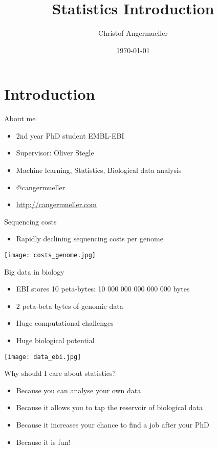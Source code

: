 \documentclass{beamer}
\author{Christof Angermueller}
\title{Statistics Introduction}
\date{\today}
\begin{document}
 

\section{Introduction}

\begin{frame}{About me}
  \begin{itemize}
    \item 2nd year PhD student EMBL-EBI
    \item Supervisor: Oliver Stegle
    \item Machine learning, Statistics, Biological data analysis
    \item @cangermueller
    \item \url{http://cangermueller.com}
  \end{itemize}
\end{frame}

\begin{frame}{Sequencing costs}
  \begin{itemize}
    \item Rapidly declining sequencing costs per genome
  \end{itemize}
  \begin{center}
    \texttt{[image: costs\_genome.jpg]}
  \end{center}
\end{frame}

\begin{frame}{Big data in biology}
  \begin{itemize}
    \item EBI stores 10 peta-bytes: 10 000 000 000 000 000 bytes
    \item 2 peta-beta bytes of genomic data
    \item {\color{red} Huge computational challenges}
    \item {\color{green} Huge biological potential}
  \end{itemize}
  \begin{center}
    \texttt{[image: data\_ebi.jpg]}
  \end{center}
\end{frame}

\begin{frame}{Why should I care about statistics?}
  \begin{itemize}
    \item Because you can analyse your own data
    \item Because it allows you to tap the reservoir of biological data
    \item Because it increases your chance to find a job after your PhD
    \item Because it is fun!
  \end{itemize}
\end{frame}
\end{document}
